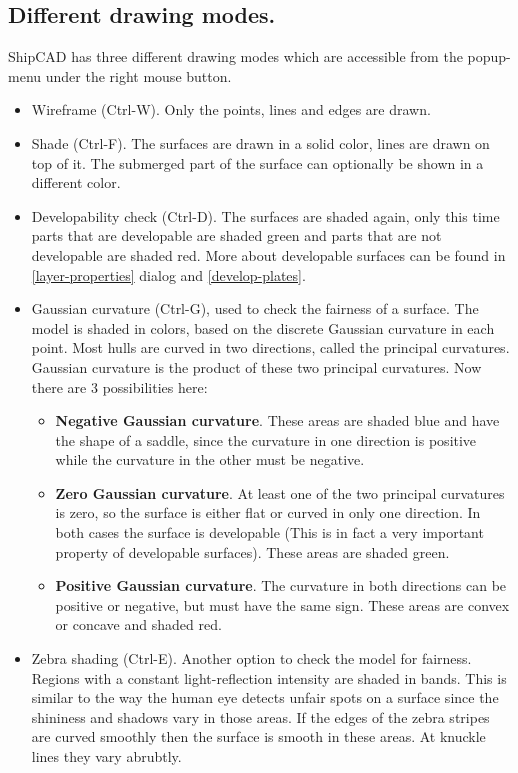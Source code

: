 \documentclass[12pt]{article}
\begin{document}
\subsection{Different drawing modes.}
ShipCAD has three different drawing modes which are accessible from the popup-menu under the
right mouse button.

\begin{itemize}

  \item Wireframe (Ctrl-W). Only the points, lines and edges are drawn.

  \item Shade (Ctrl-F). The surfaces are drawn in a solid color, lines
are drawn on top of it. The submerged part of the surface can
optionally be shown in a different color.

  \item Developability check (Ctrl-D). The surfaces are shaded again,
only this time parts that are developable are shaded green and parts
that are not developable are shaded red. More about developable
surfaces can be found in \ref{layer-properties} dialog
and \ref{develop-plates}.

  \item Gaussian curvature (Ctrl-G), used to check the fairness of a
surface. The model is shaded in colors, based on the discrete Gaussian
curvature in each point. Most hulls are curved in two directions,
called the principal curvatures.  Gaussian curvature is the product of
these two principal curvatures. Now there are 3 possibilities here:

  \begin{itemize}

    \item \textbf{Negative Gaussian curvature}. These areas are shaded blue and
have the shape of a saddle, since the curvature in one direction is
positive while the curvature in the other must be negative.

    \item \textbf{Zero Gaussian curvature}. At least one of the two principal
curvatures is zero, so the surface is either flat or curved in only
one direction. In both cases the surface is developable (This is in
fact a very important property of developable surfaces). These areas
are shaded green.

    \item \textbf{Positive Gaussian curvature}. The curvature in both
directions can be positive or negative, but must have the same
sign. These areas are convex or concave and shaded red.

  \end{itemize}

  \item Zebra shading (Ctrl-E). Another option to check the model for
fairness. Regions with a constant light-reflection intensity are
shaded in bands. This is similar to the way the human eye detects
unfair spots on a surface since the shininess and shadows vary in
those areas. If the edges of the zebra stripes are curved smoothly
then the surface is smooth in these areas. At knuckle lines they vary
abrubtly.

\end{itemize}
\end{document}
